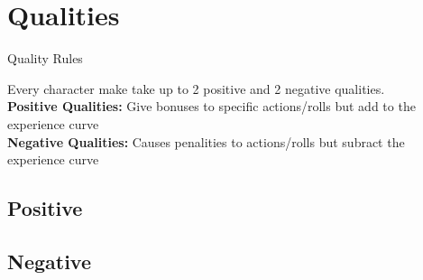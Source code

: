 \section*{Qualities}
\begin{multicols}{2}
\begin{mercHeading}
Quality Rules
\end{mercHeading}
Every character make take up to 2 positive and 2 negative qualities.\\
\textbf{Positive Qualities:} Give bonuses to specific actions/rolls but add to the experience curve\\
\textbf{Negative Qualities:} Causes penalities to actions/rolls but subract the experience curve\\

\subsection*{Positive}

\subsection*{Negative}

\end{multicols}